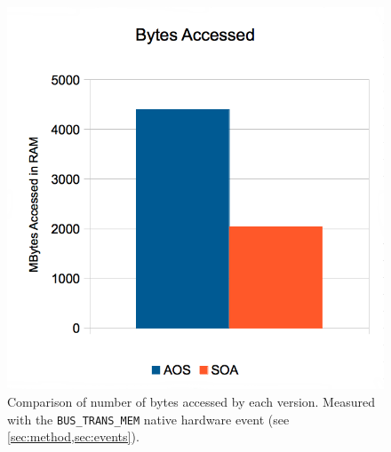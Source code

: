 \documentclass[abstract=on,9pt,twocolumn]{scrartcl}
\begin{document}
\begin{figure}[!p]
	\begin{center}
		\includegraphics[width=\columnwidth]{images/report.april/bytes.png}
	\end{center}
	\caption{Comparison of number of bytes accessed by each version. Measured with the \texttt{BUS\_TRANS\_MEM} native hardware event (see \cref{sec:method,sec:events}).}
	\label{fig:bytes}
\end{figure}
\end{document}
